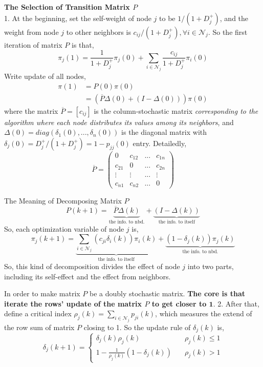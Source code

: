 	\textbf{The Selection of Transition Matrix $P$} \\
	1. At the beginning, set the self-weight of node $j$ to be $1/(1+D^+_{j})$, and the weight from node $j$ to other neighbors is $c_{ij}/(1+D^+_{j}),\forall i\in\mathcal{N}_j$. So the first iteration of matrix $P$ is that,
	$$
	\pi_j(1) = \frac{1}{1+D^+_{j}}\pi_j(0) + \sum_{i\in\mathcal{N}_j} \frac{c_{ij}}{1+D^+_{j}} \pi_i(0)
	$$
	Write update of all nodes,
	\begin{equation*}
		\begin{split}
		\pi(1) &= P(0)\pi(0) \\
		&=(\overline{P}\Delta(0)+(I-\Delta(0)))\pi(0)
		\end{split}
	\end{equation*}
	where the matrix $\overline{P}=[c_{ij}]$ is the column-stochastic matrix \emph{corresponding to the algorithm where each node distributes its values among its neighbors}, and $\Delta(0)=diag(\delta_1(0),...,\delta_n(0))$ is the diagonal matrix with $\delta_j(0)=D_j^+/(1+D_j^+) = 1-p_{jj}(0)$ entry. Detailedly, 
	$$
	\overline{P} = \begin{pmatrix} 0 & c_{12} & ... & c_{1n} \\
								  c_{21} & 0 & ... & c_{2n} \\ 
							      \vdots & \vdots & ... & \vdots \\
						      	  c_{n1} & c_{n2} & ... & 0\end{pmatrix}
	$$
	\begin{remark}{The Meaning of Decomposing Matrix $P$}{}
		$$
		P(k+1) =\underbrace{\overline{P}\Delta(k)}_{\text{the info. to nbd.}}+ \underbrace{(I-\Delta(k))}_{\text{the info. to itself}}
		$$
		So, each optimization variable of node $j$ is,
		$$
		\pi_j(k+1) = \underbrace{\sum_{i\in\mathcal{N}_j}(c_{ji}\delta_i(k)) \pi_i(k)}_{\text{the info. to itself}}+\underbrace{(1-\delta_j(k))\pi_j(k)}_{\text{the info. to nbd.}}
		$$
		So, this kind of decomposition divides the effect of node $j$ into two parts, including its self-effect and the effect from neighbors.
	\end{remark}
		In order to make matrix $P$ be a doubly stochastic matrix. \textbf{The core is that iterate the rows' update of the matrix $P$ to get closer to $\boldsymbol{1}$}. 
	2. After that, define a critical index $\rho_j(k)=\sum_{i\in\mathcal{N}_j}p_{ji}(k)$, which measures the extend of the row sum of matrix $P$ closing to 1. So the update rule of $\delta_j(k)$ is,
	$$
	\delta_j(k+1) = \begin{cases}\delta_j(k)\rho_j(k) \quad & \rho_j(k)\le 1  \\
								 1-\frac{1}{\rho_j(k)}(1-\delta_j(k)) \quad & \rho_j(k)> 1\end{cases}
	$$
